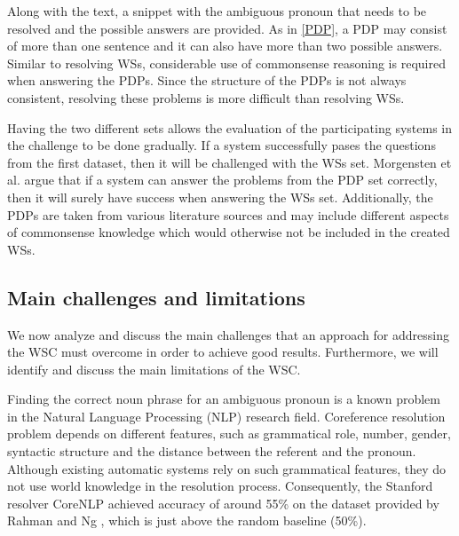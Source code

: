 Along with the text, a snippet with the ambiguous pronoun that needs to be resolved and the possible answers are provided.
As in \ref{PDP}, a PDP may consist of more than one sentence and it can also have more than two possible answers. Similar to resolving WSs, considerable use of commonsense reasoning is required when answering the PDPs. Since the structure of the PDPs is not always consistent, resolving these problems is more difficult than resolving WSs.

Having the two different sets allows the evaluation of the participating systems in the challenge to be done gradually. 
If a system successfully pases the questions from the first dataset, then it will be challenged with the WSs set. Morgensten et al. \cite{DBLP:journals/aim/MorgensternDO16} argue that if a system can answer the problems from the PDP set correctly, then it will surely have success when answering the WSs set.  
Additionally, the PDPs are taken from various literature sources and may include different aspects of commonsense knowledge which would otherwise not be included in the created WSs. 

\begin{comment}
Since the idea of the authors of the WSC was to construct this challenge as an alternative to the Turing test, it can be observed that indeed it captures the main characteristics of a Turing test: 

\begin{itemize}
	\item it requires the subject to respond on a non-domain specific set of English sentences
	\item it is easy to solve by native English speakers
	\item to pass successfully the test, the subject has to think
\end{itemize}
\end{comment}


\subsection{Main challenges and limitations}
We now analyze and discuss the main challenges that an approach for addressing the WSC must overcome in order to achieve good results. Furthermore, we will identify and discuss the main limitations of the WSC. 

Finding the correct noun phrase for an ambiguous pronoun is a known problem in the Natural Language Processing (NLP) research field. Coreference resolution problem depends on different features, such as grammatical role, number, gender, syntactic structure and the distance between the referent and the pronoun. Although existing automatic systems rely on such grammatical features, they do not use world knowledge in the resolution process. Consequently, the Stanford resolver CoreNLP \cite{lee11conllst}  achieved accuracy of around 55\% on the dataset provided by Rahman and Ng \cite{DBLP:conf/emnlp/RahmanN12}, which is just above the random baseline (50\%).
	

